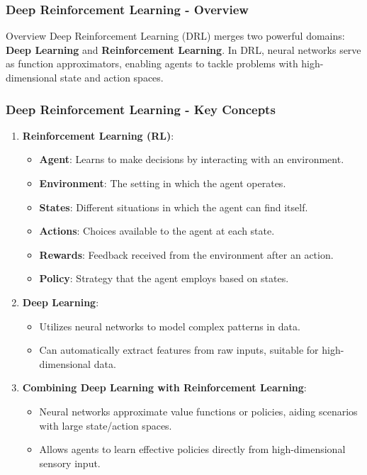 \documentclass[aspectratio=169]{beamer}
\begin{document}
\begin{frame}[fragile]
    \frametitle{Deep Reinforcement Learning - Overview}
    \begin{block}{Overview}
    Deep Reinforcement Learning (DRL) merges two powerful domains: \textbf{Deep Learning} and \textbf{Reinforcement Learning}. In DRL, neural networks serve as function approximators, enabling agents to tackle problems with high-dimensional state and action spaces.
    \end{block}
\end{frame}

\begin{frame}[fragile]
    \frametitle{Deep Reinforcement Learning - Key Concepts}
    \begin{enumerate}
        \item \textbf{Reinforcement Learning (RL)}:
        \begin{itemize}
            \item \textbf{Agent}: Learns to make decisions by interacting with an environment.
            \item \textbf{Environment}: The setting in which the agent operates.
            \item \textbf{States}: Different situations in which the agent can find itself.
            \item \textbf{Actions}: Choices available to the agent at each state.
            \item \textbf{Rewards}: Feedback received from the environment after an action.
            \item \textbf{Policy}: Strategy that the agent employs based on states.
        \end{itemize}
        
        \item \textbf{Deep Learning}:
        \begin{itemize}
            \item Utilizes neural networks to model complex patterns in data.
            \item Can automatically extract features from raw inputs, suitable for high-dimensional data.
        \end{itemize}
        
        \item \textbf{Combining Deep Learning with Reinforcement Learning}:
        \begin{itemize}
            \item Neural networks approximate value functions or policies, aiding scenarios with large state/action spaces.
            \item Allows agents to learn effective policies directly from high-dimensional sensory input.
        \end{itemize}
    \end{enumerate}
\end{frame}
\end{document}
